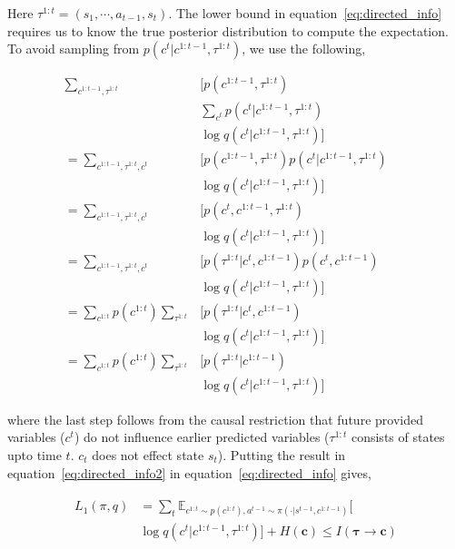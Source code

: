 \documentclass{article} %
\begin{document}
Here $\tau^{1:t} = (s_1, \cdots, a_{t-1}, s_{t})$. The lower bound in equation~\ref{eq:directed_info} requires us to know the true posterior distribution to compute the expectation. To avoid sampling from $p(c^{t}|c^{1:t-1}, \tau^{1:t})$, we use the following,

\begin{align}
 \sum_{c^{1:t-1}, \tau^{1:t}}& \Big[ p(c^{1:t-1}, \tau^{1:t}) & \nonumber\\
& \sum_{c^{t}} p(c^{t} | c^{1:t-1}, \tau^{1:t}) \nonumber\\
& \log q(c^{t} | c^{1:t-1}, \tau^{1:t})\Big] \nonumber \\
= \sum_{c^{1:t-1}, \tau^{1:t},c^{t}}& \Big[ p(c^{1:t-1}, \tau^{1:t}) p(c^{t} | c^{1:t-1}, \tau^{1:t}) & &\nonumber\\
& \log q(c^{t} | c^{1:t-1}, \tau^{1:t})\Big] \nonumber \\
= \sum_{c^{1:t-1}, \tau^{1:t},c^{t}}& \Big[ p(c^{t}, c^{1:t-1}, \tau^{1:t}) \nonumber\\
& \log q(c^{t} | c^{1:t-1}, \tau^{1:t})] \nonumber \\
= \sum_{c^{1:t-1}, \tau^{1:t},c^{t}}&  \Big[p(\tau^{1:t} | c^{t}, c^{1:t-1}) p(c^{t}, c^{1:t-1}) \nonumber\\
& \log q(c^{t} | c^{1:t-1}, \tau^{1:t}) \Big] \nonumber \\
= \sum_{c^{1:t}} p(c^{1:t})\sum_{\tau^{1:t}}&  \Big[p(\tau^{1:t} | c^{t}, c^{1:t-1}) \nonumber\\
& \log q(c^{t} | c^{1:t-1}, \tau^{1:t}) \Big] \nonumber \\
= \sum_{c^{1:t}} p(c^{1:t})\sum_{\tau^{1:t}}&  \Big[p(\tau^{1:t} | c^{1:t-1}) \nonumber\\
& \log q(c^{t} | c^{1:t-1}, \tau^{1:t}) \Big]
\label{eq:directed_info2}
\end{align}

where the last step follows from the causal restriction that future provided variables ($c^t$) do not  influence earlier predicted variables ($\tau^{1:t}$ consists of states upto time $t$. $c_t$ does not effect state $s_t$). Putting the result in equation~\ref{eq:directed_info2} in equation~\ref{eq:directed_info} gives,

\begin{align}
\begin{split}
 L_{1}(\pi, q) &= \sum_{t} \mathbb{E}_{c^{1:t} \sim p(c^{1:t}), a^{t-1} \sim \pi(\cdot | s^{t-1},c^{1:t-1})} \Big[ \\
 & \log q(c^{t} | c^{1:t-1}, \tau^{1:t}) \Big] + H(\boldsymbol{c}) \leq I(\boldsymbol{\tau} \rightarrow \boldsymbol{c})
\label{eq:loss1}
\end{split}
\end{align}
\end{document}
